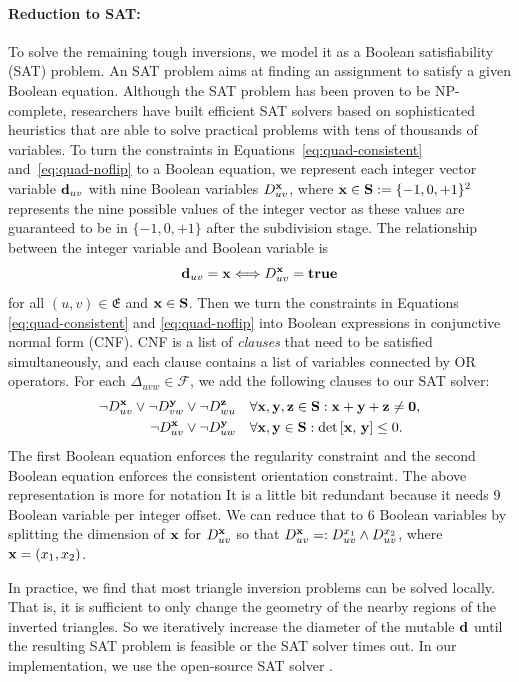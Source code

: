 \paragraph*{Reduction to SAT:}
To solve the remaining tough inversions,  we model it as a Boolean satisfiability (SAT) problem.  An SAT problem aims at finding an assignment to satisfy a given Boolean equation.  Although the SAT problem has been proven to be NP-complete, researchers have built efficient SAT solvers based on sophisticated heuristics that are able to solve practical problems with tens of thousands of variables.  To turn the constraints in Equations~\eqref{eq:quad-consistent} and~\eqref{eq:quad-noflip} to a Boolean equation, we represent each integer vector variable ${\mathbf{d}}_{uv}$ with nine Boolean variables $D^{\mathbf{x}}_{uv}$, where $\mathbf{x} \in \mathbf{S} := \{-1, 0, +1\}^2$ represents the nine possible values of the integer vector as these values are guaranteed to be in $\{-1, 0, +1\}$ after the subdivision stage.  The relationship between the integer variable and Boolean variable is
\[
{\mathbf{d}}_{uv}=\mathbf{x} \Longleftrightarrow D^{\mathbf{x}}_{uv}= \mathbf{true}
\]
for all $(u,v)\in\mathfrak{E}$ and $\mathbf{x} \in \mathbf{S}$.  Then we turn the constraints in Equations \eqref{eq:quad-consistent} and \eqref{eq:quad-noflip} into Boolean expressions in conjunctive normal form (CNF). CNF is a list of \emph{clauses} that need to be satisfied simultaneously, and each clause contains a list of variables connected by OR operators.  For each $\Delta_{uvw} \in \mathcal{F}$, we add the following clauses to our SAT solver: 
\begin{align*}
\lnot D^{\mathbf{x}}_{uv} \lor \lnot D^{\mathbf{y}}_{vw} \lor \lnot D^{\mathbf{z}}_{wu} \quad &\forall \mathbf{x},\mathbf{y},\mathbf{z}\in {\mathbf{S}}:\mathbf{x}+\mathbf{y}+\mathbf{z}\ne \mathbf{0}, \\
\lnot D^{\mathbf{x}}_{uv} \lor \lnot D^{\mathbf{y}}_{uw} \quad &\forall \mathbf{x},\mathbf{y}\in {\mathbf{S}}: \mathrm{det} \left[ \mathbf{x},\, \mathbf{y} \right] \le 0.
\end{align*}
The first Boolean equation enforces the regularity constraint and the second Boolean equation enforces the consistent orientation constraint.  The above representation is more for notation It is a little bit redundant because it needs 9 Boolean variable per integer offset.  We can reduce that to 6 Boolean variables by splitting the dimension of $\mathbf{x}$ for $D^{\mathbf{x}}_{uv}$ so that $D^{\mathbf{x}}_{uv}=:D^{x_1}_{uv}\land D^{x_2}_{uv}$, where $\mathbf{x}=(x_1, x_2)$.

In practice, we find that most triangle inversion problems can be solved locally. That is, it is sufficient to only change the geometry of the nearby regions of the inverted triangles.  So we iteratively increase the diameter of the mutable ${\mathbf{d}}$ until the resulting SAT problem is feasible or the SAT solver times out.  In our implementation, we use the open-source SAT solver \cite{liang2016learning}.  %

